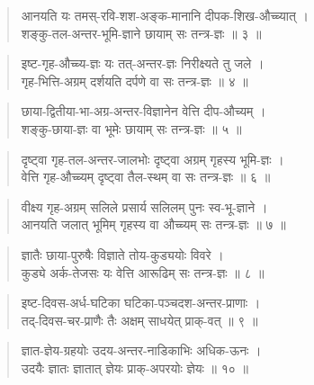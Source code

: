 \documentclass[11pt,a4paper]{article}
\newenvironment{shloka}{\begin{verse}\devanagarifont\large}{\end{verse}}
\begin{document}
\begin{shloka}
आनयति यः तमस्-रवि-शश-अङ्क-मानानि दीपक-शिख-औच्च्यात् ।\\
शङ्कु-तल-अन्तर-भूमि-ज्ञाने छायाम् सः तन्त्र-ज्ञः ॥ ३ ॥
\end{shloka}

\begin{shloka}
इष्ट-गृह-औच्च्य-ज्ञः यः तत्-अन्तर-ज्ञः निरीक्ष्यते तु जले ।\\
गृह-भित्ति-अग्रम् दर्शयति दर्पणे वा सः तन्त्र-ज्ञः ॥ ४ ॥
\end{shloka}

\begin{shloka}
छाया-द्वितीया-भा-अग्र-अन्तर-विज्ञानेन वेत्ति दीप-औच्यम् ।\\
शङ्कु-छाया-ज्ञः वा भूमेः छायाम् सः तन्त्र-ज्ञः ॥ ५ ॥
\end{shloka}

\begin{shloka}
दृष्ट्वा गृह-तल-अन्तर-जालभोः दृष्ट्वा अग्रम् गृहस्य भूमि-ज्ञः ।\\
वेत्ति गृह-औच्च्यम् दृष्ट्वा तैल-स्थम् वा सः तन्त्र-ज्ञः ॥ ६ ॥
\end{shloka}

\begin{shloka}
वीक्ष्य गृह-अग्रम् सलिले प्रसार्य सलिलम् पुनः स्व-भू-ज्ञाने ।\\
आनयति जलात् भूमिम् गृहस्य वा औच्च्यम् सः तन्त्र-ज्ञः ॥ ७ ॥
\end{shloka}

\begin{shloka}
ज्ञातैः छाया-पुरुषैः विज्ञाते तोय-कुड्ययोः विवरे ।\\
कुड्ये अर्क-तेजसः यः वेत्ति आरूढिम् सः तन्त्र-ज्ञः ॥ ८ ॥
\end{shloka}

\vspace{0.3cm}

\begin{shloka}
इष्ट-दिवस-अर्ध-घटिका घटिका-पञ्चदश-अन्तर-प्राणाः ।\\
तद्-दिवस-चर-प्राणैः तैः अक्षम् साधयेत् प्राक्-वत् ॥ ९ ॥
\end{shloka}

\vspace{0.3cm}

\begin{shloka}
ज्ञात-ज्ञेय-ग्रहयोः उदय-अन्तर-नाडिकाभिः अधिक-ऊनः ।\\
उदयैः ज्ञातः ज्ञातात् ज्ञेयः प्राक्-अपरयोः ज्ञेयः ॥ १० ॥
\end{shloka}
\end{document}
